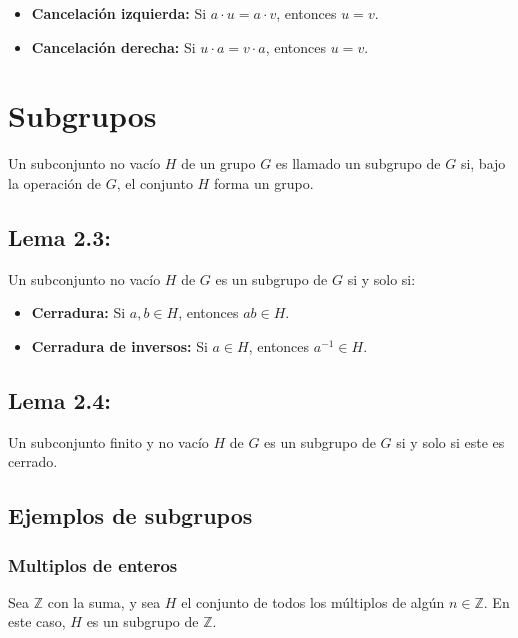 \documentclass{article}
\begin{document}
\begin{itemize}
\item \textbf{Cancelación izquierda:} Si $a\cdot u=a\cdot v$, entonces $u=v$.

\item \textbf{Cancelación derecha:} Si $u\cdot a=v\cdot a$, entonces $u=v$.
\end{itemize}

\newpage
\section{Subgrupos}

Un subconjunto no vacío $H$ de un grupo $G$ es llamado un subgrupo de $G$ si, bajo la operación de $G$, el conjunto $H$ forma un grupo.

\subsection*{\color{blue} Lema 2.3:}

Un subconjunto no vacío $H$ de $G$ es un subgrupo de $G$ si y solo si:

\begin{itemize}
\item \textbf{Cerradura:} Si $a,b\in H$, entonces $ab\in H$.

\item \textbf{Cerradura de inversos:} Si $a\in H$, entonces $a^{-1}\in H$.
\end{itemize}

\subsection*{\color{blue} Lema 2.4:}

Un subconjunto finito y no vacío $H$ de $G$ es un subgrupo de $G$ si y solo si este es cerrado.

\subsection*{\color{teal} Ejemplos de subgrupos}

\subsubsection*{\color{teal} Multiplos de enteros}

Sea $\mathbb{Z}$ con la suma, y sea $H$ el conjunto de todos los múltiplos de algún $n\in\mathbb{Z}$. En este caso, $H$ es un subgrupo de $\mathbb{Z}$.
\end{document}
